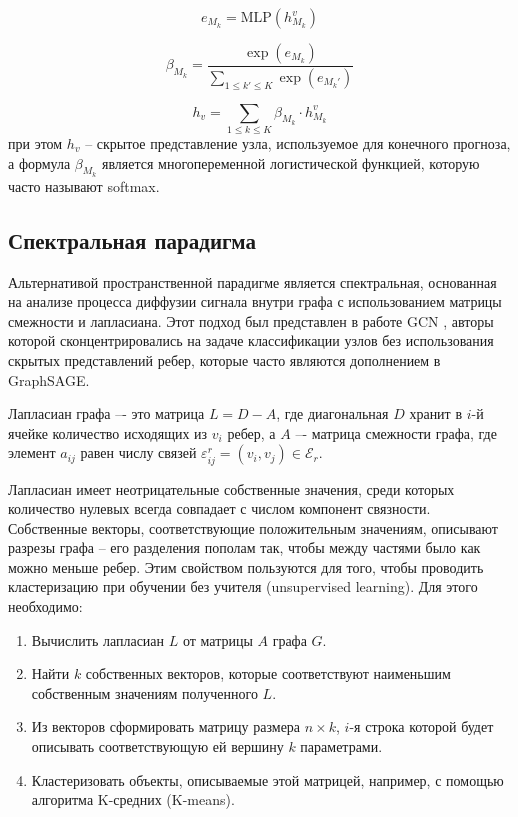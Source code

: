 \begin{equation}
    e_{M_k} = \text{MLP} \left( h_{M_k}^v \right)
\end{equation}

\begin{equation}
    \beta_{M_k} = \frac{\exp\left(e_{M_k}\right)}{\sum_{1\leq k' \leq K} \exp\left(e_{M_k'}\right)}
\end{equation}

\begin{equation}
    h_v = \sum_{1\leq k \leq K} \beta_{M_k} \cdot h_{M_k}^v
\end{equation}
при этом \(h_v\) -- скрытое представление узла, используемое для конечного прогноза, а формула \(\beta_{M_k}\) является многопеременной логистической функцией, которую часто называют softmax.

\pagebreak



\subsection{Спектральная парадигма}

Альтернативой пространственной парадигме является спектральная, основанная на анализе процесса диффузии сигнала внутри графа с использованием матрицы смежности и лапласиана. Этот подход был представлен в работе GCN \cite{kipf2017}, авторы которой сконцентрировались на задаче классификации узлов без использования скрытых представлений ребер, которые часто являются дополнением в GraphSAGE.

Лапласиан графа –- это матрица \(L = D - A\), где диагональная \(D\) хранит в \(i\)-й ячейке количество исходящих из \(v_i\) ребер, а \(A\) –- матрица смежности графа, где элемент \(a_{ij}\) равен числу связей \(\varepsilon_{ij}^r = (v_i , v_j) \in \mathcal{E}_r\).

Лапласиан имеет неотрицательные собственные значения, среди которых количество нулевых всегда совпадает с числом компонент связности. Собственные векторы, соответствующие положительным значениям, описывают разрезы графа -- его разделения пополам так, чтобы между частями было как можно меньше ребер. Этим свойством пользуются для того, чтобы проводить кластеризацию при обучении без учителя (unsupervised learning). Для этого необходимо:

\begin{enumerate}
    \item Вычислить лапласиан \(L\) от матрицы \(A\) графа \(G\).

    \item Найти \(k\) собственных векторов, которые соответствуют наименьшим собственным значениям полученного \(L\).

    \item Из векторов сформировать матрицу размера \(n \times k\), \(i\)-я строка которой будет описывать соответствующую ей вершину \(k\) параметрами.

    \item Кластеризовать объекты, описываемые этой матрицей, например, с помощью алгоритма K-средних (K-means).
\end{enumerate}

